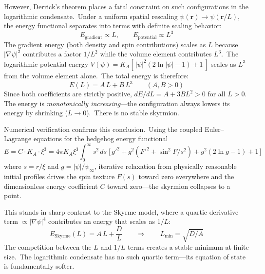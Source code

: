 ﻿\documentclass[12pt,letterpaper]{article}
\newcommand{\Ka}{K_{\!A}}
\begin{document}
However, Derrick's theorem \cite{derrick1964} places a fatal constraint on such
configurations in the logarithmic condensate.\ Under a uniform spatial rescaling
$\psi(\mathbf{r}) \to \psi(\mathbf{r}/L)$, the energy functional separates into
terms with definite scaling behavior:
%
\begin{equation}
  E_{\mathrm{gradient}} \propto L, \qquad
  E_{\mathrm{potential}} \propto L^3
\end{equation}
%
The gradient energy (both density and spin contributions) scales as $L$ because
$|\nabla\psi|^2$ contributes a factor $1/L^2$ while the volume element contributes
$L^3$.\ The logarithmic potential energy $V(\psi) = \Ka[\,|\psi|^2(2\ln|\psi| - 1) + 1\,]$
scales as $L^3$ from the volume element alone.\ The total energy is therefore:
%
\begin{equation}
  E(L) = A\,L + B\,L^3 \qquad (A, B > 0)
\end{equation}
%
Since both coefficients are strictly positive, $dE/dL = A + 3BL^2 > 0$ for all $L > 0$.
The energy is \emph{monotonically increasing}---the configuration always lowers its
energy by shrinking ($L \to 0$).\ There is no stable skyrmion.

Numerical verification confirms this conclusion.\ Using the coupled Euler--Lagrange
equations for the hedgehog energy functional
%
\begin{equation}
  E = C \cdot \Ka \cdot \xi^3 = 4\pi\Ka\xi^3 \int_0^\infty s^2\,ds\;
    \bigl[\,g'^2 + g^2(F'^2 + \sin^2\!F/s^2) + g^2(2\ln g - 1) + 1\,\bigr]
\end{equation}
%
where $s = r/\xi$ and $g = |\psi|/\psi_\infty$, iterative relaxation from physically
reasonable initial profiles drives the spin texture $F(s)$ toward zero everywhere
and the dimensionless energy coefficient $C$ toward zero---the skyrmion collapses
to a point.

This stands in sharp contrast to the Skyrme model, where a quartic derivative
term $\propto |\nabla\psi|^4$ contributes an energy that scales as $1/L$:
%
\begin{equation}
  E_{\mathrm{Skyrme}}(L) = A\,L + \frac{D}{L} \qquad \Rightarrow \qquad
  L_{\mathrm{min}} = \sqrt{D/A}
\end{equation}
%
The competition between the $L$ and $1/L$ terms creates a stable minimum at finite
size.\ The logarithmic condensate has no such quartic term---its equation of state
is fundamentally softer.
\end{document}
